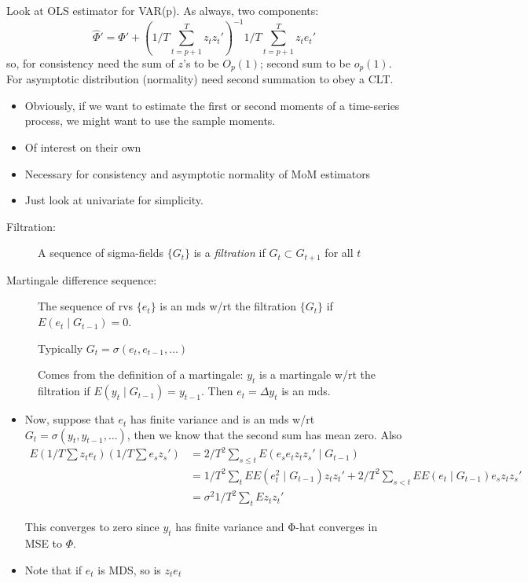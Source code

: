 Look at OLS estimator for VAR(p). As always, two components:
\[\hat Φ' = Φ' + (1/T ∑_{t=p+1}^T z_t z_t')^{-1} 1/T
∑_{t=p+1}^T z_t e_t'\] so, for consistency need the sum of $z$'s to be
$O_p(1)$; second sum to be $o_p(1)$. For asymptotic distribution
(normality) need second summation to obey a CLT.

\begin{itemize}
\item Obviously, if we want to estimate the first or second moments of
  a time-series process, we might want to use the sample moments.
\item Of interest on their own
\item Necessary for consistency and asymptotic normality of MoM
  estimators
\item Just look at univariate for simplicity.
\end{itemize}

\begin{description}
\item[Filtration:]
  A sequence of sigma-fields $\{G_t\}$ is a \emph{filtration} if $G_t
  ⊂ G_{t+1}$ for all $t$
\item[Martingale difference sequence:]
  The sequence of rvs $\{e_t\}$ is an mds w/rt the filtration $\{G_t\}$ if
  $E(e_t ∣ G_{t-1}) = 0$.

  Typically $G_t = σ(e_t, e_{t-1},…)$

  Comes from the definition of a martingale: $y_t$ is a martingale
  w/rt the filtration if $E(y_t ∣ G_{t-1}) = y_{t-1}$. Then $e_t =
  Δy_t$ is an mds.
\end{description}

\begin{itemize}
\item Now, suppose that $e_t$ has finite variance and is an mds w/rt
  $G_t = σ(y_t, y_{t-1},…)$, then we know that the second sum has mean
  zero. Also
  \begin{align*}
    E (1/T ∑ z_t e_t)(1/T ∑ e_s z_s')
    &= 2/T^2 ∑_{s ≤ t} E(e_s e_t z_t z_s' ∣ G_{t-1}) \\
    &= 1/T^2 ∑_t E E( e_t^2 ∣ G_{t-1}) z_t z_t' + 2/T^2 ∑_{s < t} E E(
    e_t ∣ G_{t-1}) e_s z_t z_s' \\
    &= σ^2 1/T^2 ∑_t E z_t z_t'
  \end{align*}

  This converges to zero since $y_t$ has finite variance and Φ-hat
  converges in MSE to $Φ$.
\item Note that if $e_t$ is MDS, so is $z_t e_t$
\end{itemize}

